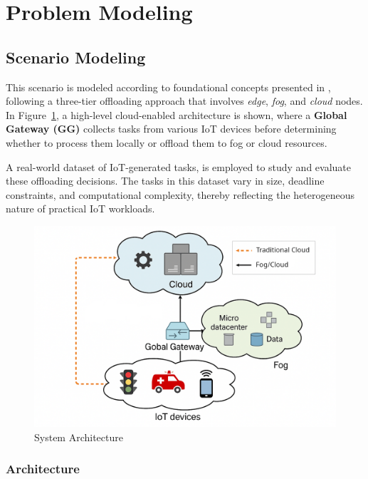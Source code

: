 \documentclass[preprint,12pt]{elsarticle}
\begin{document}
\section{Problem Modeling}
\label{sec:problem_modeling}

\subsection{Scenario Modeling}
\label{sec:problem_modeling}

This scenario is modeled according to foundational concepts presented in \cite{aazam_cloud_2022, bukhari_intelligent_2022, jazayeri_autonomous_2021}, following a three-tier offloading approach that involves \textit{edge}, \textit{fog}, and \textit{cloud} nodes. In Figure~\ref{fig:cloud-architecture}, a high-level cloud-enabled architecture is shown, where a \textbf{Global Gateway (GG)} collects tasks from various IoT devices before determining whether to process them locally or offload them to fog or cloud resources.


A real-world dataset of IoT-generated tasks, is employed to study and evaluate these offloading decisions. The tasks in this dataset vary in size, deadline constraints, and computational complexity, thereby reflecting the heterogeneous nature of practical IoT workloads.

\begin{figure}[ht]
    \centering
    \includegraphics[width=0.75\linewidth]{figs/cloud_architecture.png}
    \caption{System Architecture}
    \label{fig:cloud-architecture}
\end{figure}


\subsubsection{Architecture}
\label{subsec:architecture}
\end{document}

